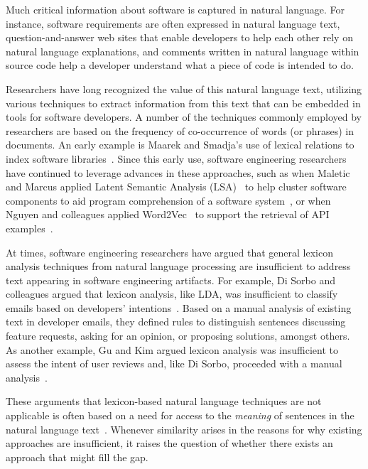 Much critical information about software is captured in natural
language. For instance, software requirements are often expressed in
natural language text, question-and-answer web sites that enable developers to help
each other rely on natural language explanations, and comments written
in natural language within
source code help a developer understand what a piece of code
is intended to do.


Researchers have long recognized the value of this natural language
text, utilizing various techniques to extract
information from this text that can be embedded in
tools for software developers.
A number of the techniques commonly employed by researchers are based on the
frequency of co-occurrence of words (or phrases) in documents. An
early example is Maarek and Smadja's use of lexical relations to index
software libraries~\cite{maarek1989}. Since this early use, software engineering
researchers have continued to leverage advances in
these approaches, such as when
Maletic and Marcus applied Latent Semantic
Analysis (LSA)~\cite{deerwester1990LSI} to help cluster software components to aid
program comprehension of a software system~\cite{Marcus2003}, or when Nguyen and colleagues
applied Word2Vec~\cite{mikolov2013word2vec} to support the retrieval of API
examples~\cite{nguyen2017}.



At times, software engineering researchers have argued
that general lexicon analysis techniques from natural language
processing are insufficient to address text appearing in
software engineering artifacts.
For example, Di Sorbo and colleagues
argued that lexicon analysis, like LDA, was insufficient to
classify emails based on developers'
intentions~\cite{DiSorbo2015}.
 Based on a manual
analysis of existing text in developer emails, they defined rules to
distinguish sentences discussing feature requests, asking for an
opinion, or proposing solutions, amongst others.  As another example,
Gu and Kim argued lexicon analysis was insufficient to
assess the intent of user reviews and, like Di Sorbo, proceeded
with a manual analysis~\cite{gu2015}.



These arguments that lexicon-based natural
language techniques are not applicable is often based
on a need for access to the \textit{meaning} of
sentences in the natural language text~\cite{DiSorbo2015, gu2015, Arya2019}. Whenever similarity arises in the reasons for
why existing approaches are insufficient,
it raises the question
of whether there exists an approach that might fill
the gap.



